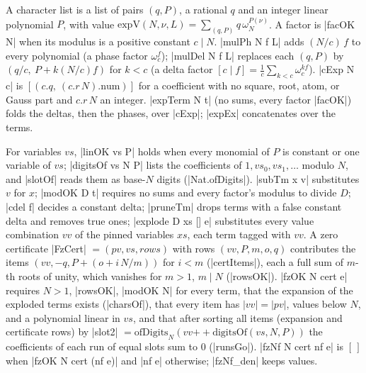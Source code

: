 \begin{definition}\label{def:lean-sym-expTerm}
A character list is a list of pairs $(q,P)$, a rational $q$ and an integer linear polynomial $P$, with value $\mathrm{expV}(N,\nu,L)=\sum_{(q,P)}q\,\omega_N^{P(\nu)}$. A factor is \lean|facOK N| when its modulus is a positive constant $c\mid N$. \lean|mulPh N f L| adds $(N/c)\,f$ to every polynomial (a phase factor $\omega_c^{f}$); \lean|mulDel N f L| replaces each $(q,P)$ by $(q/c,\ P+k(N/c)f)$ for $k<c$ (a delta factor $[c\mid f]=\frac1c\sum_{k<c}\omega_c^{kf}$). \lean|cExp N c| is $[(c.q,\ (c.r\,N).\mathrm{num})]$ for a coefficient with no square, root, atom, or Gauss part and $c.r\,N$ an integer. \lean|expTerm N t| (no sums, every factor \lean|facOK|) folds the deltas, then the phases, over \lean|cExp|; \lean|expEx| concatenates over the terms.
\end{definition}

\begin{definition}\label{def:lean-sym-fzOK}
For variables $vs$, \lean|linOK vs P| holds when every monomial of $P$ is constant or one variable of $vs$; \lean|digitsOf vs N P| lists the coefficients of $1,vs_0,vs_1,\ldots$ modulo $N$, and \lean|slotOf| reads them as base-$N$ digits (\lean|Nat.ofDigits|). \lean|subTm x v| substitutes $v$ for $x$; \lean|modOK D t| requires no sums and every factor's modulus to divide $D$; \lean|cdel f| decides a constant delta; \lean|pruneTm| drops terms with a false constant delta and removes true ones; \lean|explode D xs [] e| substitutes every value combination $vv$ of the pinned variables $xs$, each term tagged with $vv$. A zero certificate \lean|FzCert| $=(pv,vs,rows)$ with rows $(vv,P,m,o,q)$ contributes the items $(vv,-q,P+(o+i\,N/m))$ for $i<m$ (\lean|certItems|), each a full sum of $m$-th roots of unity, which vanishes for $m>1$, $m\mid N$ (\lean|rowsOK|). \lean|fzOK N cert e| requires $N>1$, \lean|rowsOK|, \lean|modOK N| for every term, that the expansion of the exploded terms exists (\lean|charsOf|), that every item has $|vv|=|pv|$, values below $N$, and a polynomial linear in $vs$, and that after sorting all items (expansion and certificate rows) by \lean|slot2| $=\mathrm{ofDigits}_N(vv\mathbin{+\!\!+}\mathrm{digitsOf}(vs,N,P))$ the coefficients of each run of equal slots sum to $0$ (\lean|runsGo|). \lean|fzNf N cert nf e| is $[\,]$ when \lean|fzOK N cert (nf e)| and \lean|nf e| otherwise; \lean|fzNf_den| keeps values.
\end{definition}

